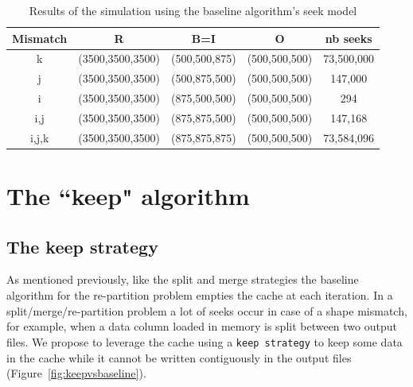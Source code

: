 \documentclass[conference]{IEEEtran}
\begin{document}
\begin{table}[ht]
  \centering
  \caption{Results of the simulation using the baseline algorithm's seek model}

   \begin{tabular}[t]{| c | c | c | c | c |}
   \hline
   Mismatch & R & B=I & O & nb seeks \\
     \hline\hline
     k & (3500,3500,3500) & (500,500,875) & (500,500,500) & 73,500,000 \\
     \hline
     j & (3500,3500,3500) & (500,875,500) & (500,500,500) & 147,000 \\
     \hline
     i & (3500,3500,3500) & (875,500,500) & (500,500,500) & 294 \\
     \hline
     i,j & (3500,3500,3500) & (875,875,500) & (500,500,500) & 147,168 \\
     \hline
     i,j,k & (3500,3500,3500) & (875,875,875) & (500,500,500) & 73,584,096 \\
     \hline
   \end{tabular}

   \label{tab:simseekmodel}

\end{table}

\section{The ``keep" algorithm}

\subsection{The keep strategy}
As mentioned previously, like the split and merge strategies the baseline
algorithm for the re-partition problem empties the cache at each iteration. In a
split/merge/re-partition problem a lot of seeks occur in case of a shape mismatch,
for example, when a data column loaded in memory is split between two output
files. We propose to leverage the cache using a \texttt{keep strategy}
to keep some data in the cache while it cannot be written contiguously in the
output files (Figure~\ref{fig:keepvsbaseline}).
\end{document}

